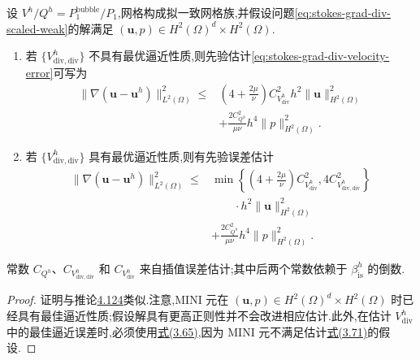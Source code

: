 \begin{corollary}\label{cor:stokes-grad-div-mini-error}
设 $V^h/Q^h=P_1^{\mathrm{bubble}}/P_1$,网格构成拟一致网格族,并假设问题\cref{eq:stokes-grad-div-scaled-weak}的解满足
$(\bm{u},p)\in H^2(\Omega)^d\times H^2(\Omega)$.
\begin{enumerate}[label=\roman*)]
  \item 若 $\{V_{\mathrm{div,div}}^h\}$ 不具有最优逼近性质,则先验估计\cref{eq:stokes-grad-div-velocity-error}可写为
  \begin{equation}\label{eq:stokes-grad-div-mini-error-no-optimal-div}
   \begin{aligned}
   \|\nabla(\bm{u}-\bm{u}^h)\|_{L^2(\Omega)}^2
   \leq{}&\left(4+\frac{2\mu}{\nu}\right)C_{V_{\mathrm{div}}^h}^2h^2
                 \|\bm{u}\|_{H^2(\Omega)}^2\\
          &+\frac{2C_{Q^h}^2}{\mu\nu}h^4\|p\|_{H^2(\Omega)}^2.
   \end{aligned}
  \end{equation}
  \item 若 $\{V_{\mathrm{div,div}}^h\}$ 具有最优逼近性质,则有先验误差估计
  \begin{equation}\label{eq:stokes-grad-div-mini-error-optimal-div}
   \begin{aligned}
   \|\nabla(\bm{u}-\bm{u}^h)\|_{L^2(\Omega)}^2
   \leq{}&\min\left\{\left(4+\frac{2\mu}{\nu}\right)C_{V_{\mathrm{div}}^h}^2,
                      4C_{V_{\mathrm{div,div}}^h}^2\right\}\\
          &\qquad\cdot h^2\|\bm{u}\|_{H^2(\Omega)}^2\\
          &+\frac{2C_{Q^h}^2}{\mu\nu}h^4\|p\|_{H^2(\Omega)}^2.
   \end{aligned}
  \end{equation}
\end{enumerate}
常数 $C_{Q^h}$、$C_{V_{\mathrm{div,div}}^h}$ 和 $C_{V_{\mathrm{div}}^h}$ 来自插值误差估计;其中后两个常数依赖于 $\beta_{\mathrm{is}}^h$ 的倒数.
\end{corollary}
\begin{proof}
证明与推论\hyperref[cor:stokes-grad-div-taylor-hood-error]{4.124}类似.注意,MINI 元在 $(\bm{u},p)\in H^2(\Omega)^d\times H^2(\Omega)$ 时已经具有最佳逼近性质;假设解具有更高正则性并不会改进相应估计.此外,在估计 $V_{\mathrm{div}}^h$ 中的最佳逼近误差时,必须使用\hyperref[eq:best-approximation-vdiv-bound]{式(3.65)},因为 MINI 元不满足估计\hyperref[eq:best-approximation-preserving-interpolant]{式(3.71)}的假设.
\end{proof}

